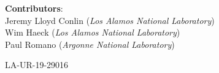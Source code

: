 \thispagestyle{plain}
\maketitle

\begin{center}\large
\textbf{Contributors}: \\
Jeremy Lloyd Conlin (\emph{Los Alamos National Laboratory}) \\
Wim Haeck (\emph{Los Alamos National Laboratory}) \\
Paul Romano (\emph{Argonne National Laboratory})
\end{center}

\vspace{4in}
\begin{center}
  \Large LA-UR-19-29016
\end{center}


\newpage
\pagestyle{front}
\tableofcontents
\clearpage
\listoftodos
